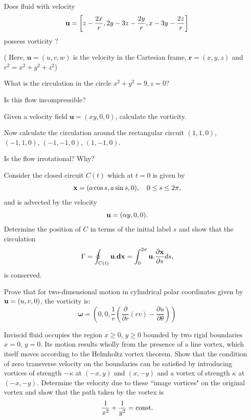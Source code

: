 \documentclass[10pt]{report}
\begin{document}
\begin{questionstar}
	Does fluid with velocity
	\[
		{{\bf u}}=\left[ {z-\frac{2x}{r},2y-3z-\frac{2y}{r},x-3y-\frac{2z}{r}} \right]
	\]
	possess vorticity ?

	( Here, $\textbf{u} = (u,v,w)$ is the velocity in the
	Cartesian frame, $\textbf{r} = (x,y,z)$ and $r^{2} = x^{2} +y^{2} +
	z^{2}$)

	What is the circulation in the circle $x^{2} + y^{2} = 9, z = 0$?

	Is this flow incompressible?
\end{questionstar}

\begin{question}
	Given a velocity field $\textbf{u} = (xy, 0, 0)$,  calculate the vorticity.

	Now calculate the circulation around the rectangular circuit $(1,1,0)$, $(-1,1,0)$,
	$(-1,-1,0)$, $(1,-1,0)$.

	Is the flow irrotational? Why?
\end{question}

\begin{questionstar}
	Consider the closed circuit $C(t)$ which at $t=0$ is given by
	\[
		{\bf x} = (a\cos s, a\sin s, 0 ), \quad 0 \le s \le 2\pi,
	\]
	and is advected by the velocity
	\[
		{\bf u} = (\alpha y, 0, 0).
	\]
	Determine the position of $C$ in terms of the initial label $s$ and show that the circulation
	\[
		\Gamma = \oint_{C(t)} {\bf u}.{\bf dx} = \int_0^{2\pi} {\bf u}.\frac{\partial {\bf x}}{\partial s} ds,
	\]
	is conserved.
\label{qn:advectedcontour}
\end{questionstar}


\begin{questionstar}
	Prove that for two-dimensional motion in cylindrical polar coordinates given
    by ${\bf u} = (u,v,0)$, the vorticity is:
\[{\bm \omega} = \left( 0,0, \frac{1}{r} \left(  \frac{\partial}{\partial r} (rv) - \frac{\partial u}{\partial \theta}\right) \right) \]
\label{qn:cylindricalvorticity}


\end{questionstar}

\begin{question}
	Inviscid fluid occupies the region $x \ge 0$, $y \ge 0$ bounded by two rigid
	boundaries $x=0$, $y=0$. Its motion results wholly from the presence of a line vortex,
	which itself moves according to the Helmholtz vortex theorem. Show that the condition of
	zero transverse velocity on the boundaries can be satisfied by introducing vortices of
	strength $-\kappa$ at $(-x,y)$ and $(x,-y)$ and a vortex of strength $\kappa$ at $(-x,-y)
	$. Determine the velocity due to these ``image vortices" on the original vortex and show
	that the path taken by the vortex is
	\[ \frac{1}{x^2} + \frac{1}{y^2} = \hbox{const}. \]
\label{qn:vortexmirror}


\end{question}
\end{document}
